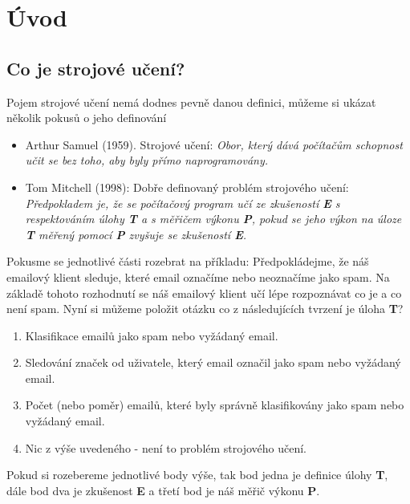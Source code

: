 











\chapter{Úvod}
\label{sec:Uvod}









\section{Co je strojové učení?}
\label{sec:UvodCoJeStrojoveUceni}

\par{Pojem strojové učení nemá dodnes pevně danou definici, můžeme si ukázat několik pokusů o jeho definování
\begin{itemize}
	\item Arthur Samuel (1959). Strojové učení: \textit{Obor, který dává počítačům schopnost učit se bez toho, aby byly přímo naprogramovány.}
	\item Tom Mitchell (1998): Dobře definovaný problém strojového učení: \textit{Předpokladem je, že se počítačový program učí ze zkušeností \textbf{E} s respektováním úlohy \textbf{T} a s měřičem výkonu \textbf{P}, pokud se jeho výkon na úloze \textbf{T} měřený pomocí \textbf{P} zvyšuje se zkušeností \textbf{E}.}
\end{itemize}}

\par{Pokusme se jednotlivé části rozebrat na příkladu: Předpokládejme, že náš emailový klient sleduje, které email označíme nebo neoznačíme jako spam. Na základě tohoto rozhodnutí se náš emailový klient učí lépe rozpoznávat co je a co není spam. Nyní si můžeme položit otázku co z následujících tvrzení je úloha \textbf{T}?
\begin{enumerate}
	\item Klasifikace emailů jako spam nebo vyžádaný email.
	\item Sledování značek od uživatele, který email označil jako spam nebo vyžádaný email.
	\item Počet (nebo poměr) emailů, které byly správně klasifikovány jako spam nebo vyžádaný email.
	\item Nic z výše uvedeného - není to problém strojového učení.
\end{enumerate}
Pokud si rozebereme jednotlivé body výše, tak bod jedna je definice úlohy \textbf{T}, dále bod dva je zkušenost \textbf{E} a třetí bod je náš měřič výkonu \textbf{P}.}

